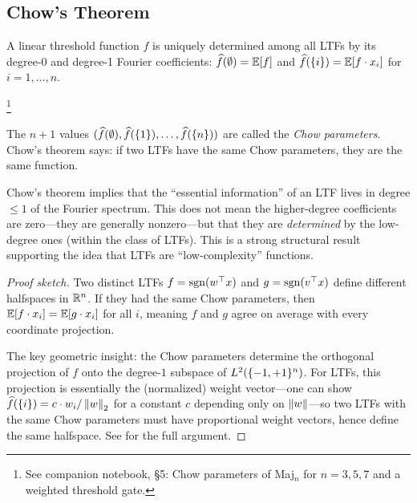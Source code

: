 \subsection{Chow's Theorem}\label{sec:chow}

\begin{theorem}
\label{thm:chow}
A linear threshold function $f$ is uniquely determined among all LTFs
by its degree-0 and degree-1 Fourier coefficients:
$\widehat{f}(\emptyset) = \mathbb{E}[f]$ and $\widehat{f}(\{i\}) = \mathbb{E}[f \cdot x_i]$ for
$i = 1, \ldots, n$.
\end{theorem}%
\footnote{See companion notebook, \S5: Chow parameters of Maj$_n$ for
$n = 3, 5, 7$ and a weighted threshold gate.}

The $n+1$ values $(\widehat{f}(\emptyset), \widehat{f}(\{1\}), \ldots, \widehat{f}(\{n\}))$
are called the \emph{Chow parameters}. Chow's theorem says: if two LTFs
have the same Chow parameters, they are the same function.

\begin{remark}\label{rem:chow-significance}
Chow's theorem implies that the ``essential information'' of an LTF lives
in degree $\leq 1$ of the Fourier spectrum. This does not mean the
higher-degree coefficients are zero---they are generally nonzero---but
that they are \emph{determined} by the low-degree ones (within the class
of LTFs). This is a strong structural result supporting the idea that
LTFs are ``low-complexity'' functions.
\end{remark}

\begin{proof}[Proof sketch]
Two distinct LTFs $f = \operatorname{sgn}(w^\top x)$ and $g = \operatorname{sgn}(v^\top x)$ define
different halfspaces in $\mathbb{R}^n$. If they had the same Chow parameters,
then $\mathbb{E}[f \cdot x_i] = \mathbb{E}[g \cdot x_i]$ for all $i$, meaning $f$ and
$g$ agree on average with every coordinate projection.

The key geometric insight: the Chow parameters determine the orthogonal
projection of $f$ onto the degree-$1$ subspace of $L^2(\{-1,+1\}^n)$. For
LTFs, this projection is essentially the (normalized) weight vector---one
can show $\widehat{f}(\{i\}) = c \cdot w_i / \left\| w \right\|_2$ for a constant $c$
depending only on $\left\| w \right\|$---so two LTFs with the same Chow parameters
must have proportional weight vectors, hence define the same halfspace.
See \citet[Chapter~5]{odonnell2014analysis} for the full argument.
\end{proof}


